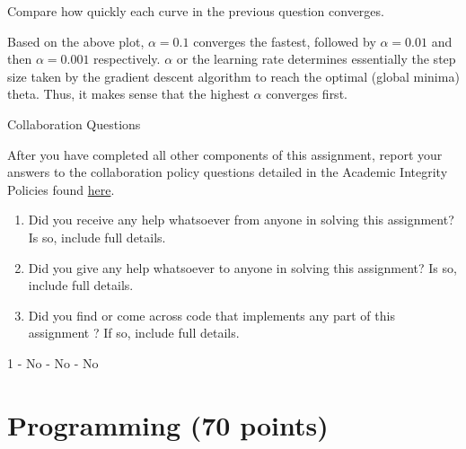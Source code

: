 \documentclass[11pt,addpoints,answers]{exam}
\begin{document}
\begin{questions}
\begin{your_solution}[height=9cm]
\texttt{[image: \{../code/plots/train\_alphas.png]}}
\end{your_solution}

\question[2] Compare how quickly each curve in the previous question converges.

\begin{your_solution}[height=8cm]


Based on the above plot, $\alpha = 0.1$ converges the fastest, followed by $\alpha = 0.01$ and then $\alpha = 0.001$ respectively. $\alpha$ or the learning rate determines essentially the step size taken by the gradient descent algorithm to reach the optimal (global minima) theta. Thus, it makes sense that the highest $\alpha$ converges first.
\end{your_solution}


\newpage
\end{questions}

{\Large Collaboration Questions}

After you have completed all other components of this assignment, report your answers to the collaboration policy questions detailed in the Academic Integrity Policies found \href{http://www.cs.cmu.edu/~mgormley/courses/10601/syllabus.html#7-academic-integrity-policies}{here}.

\begin{enumerate}
    \item Did you receive any help whatsoever from anyone in solving this assignment? Is so, include full details.
    \item Did you give any help whatsoever to anyone in solving this assignment? Is so, include full details.
    \item Did you find or come across code that implements any part of this assignment ? If so, include full details.
\end{enumerate}

\begin{your_solution}[height=6cm]
1 - No - No - No\newline 

\end{your_solution}

\newpage

\section{Programming (70 points)}
\end{document}
